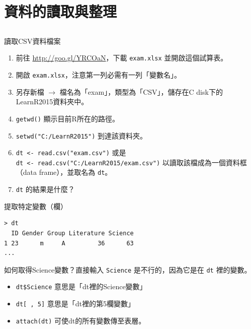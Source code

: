 \documentclass[12pt]{beamer}
\begin{document}
\section{資料的讀取與整理}\subsection{}

\begin{frame}[fragile]{讀取CSV資料檔案}
\begin{enumerate}
\item 前往 \url{http://goo.gl/YRCOaN}，下載 \verb+exam.xlsx+ 並開啟這個試算表。
\item 開啟 \verb+exam.xlsx+，注意第一列必需有一列「變數名」。
\item 另存新檔 $\rightarrow$ 檔名為「exam」，類型為「CSV」，儲存在C disk下的LearnR2015資料夾中。
\item \verb+getwd()+ 顯示目前R所在的路徑。
\item \verb+setwd("C:/LearnR2015")+ 到達該資料夾。
\item \verb+dt <- read.csv("exam.csv")+ 或是 \\
      \verb+dt <- read.csv("C:/LearnR2015/exam.csv")+ 以讀取該檔成為一個資料框（data frame），並取名為 \verb+dt+。\\
\item \verb+dt+ 的結果是什麼？
\end{enumerate}
\end{frame}


\begin{frame}[fragile]{提取特定變數（欄）}
\begin{verbatim}
> dt
  ID Gender Group Literature Science
1 23      m     A         36      63
...
\end{verbatim}

如何取得Science變數？直接輸入 \verb+Science+ 是不行的，因為它是在 \verb+dt+ 裡的變數。
\begin{itemize}
\item \verb+dt$Science+ 意思是「dt裡的Science變數」
\item \verb+dt[ , 5]+ 意思是「dt裡的第5欄變數」
\item \verb+attach(dt)+ 可使dt的所有變數傳至表層。
\end{itemize}
\end{frame}
\end{document}
